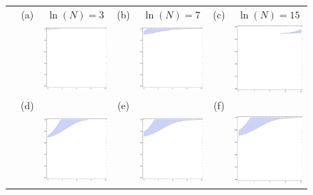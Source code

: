 \documentclass[a4paper]{article}
\begin{document}
\begin{figure}[th]
\centering
\begin{tabular}{lcccccc}
 &(a)&$\ln(N)=3$&(b)&$\ln(N)=7$&(c)&$\ln(N)=15$\\
 && \includegraphics[width=1.5in]{fdtoimageexp3.pdf} && \includegraphics[width=1.5in]{fdtoimageexp7.pdf} && \includegraphics[width=1.5in]{fdtoimageexp15.pdf} \\
 &(d)&&(e)&&(f)&\\
 && \includegraphics[width=1.5in]{gdtoimageexp3.pdf} && \includegraphics[width=1.5in]{gdtoimageexp7.pdf} && \includegraphics[width=1.5in]{gdtoimageexp15.pdf} \\

\end{tabular}
\end{figure}
\end{document}
